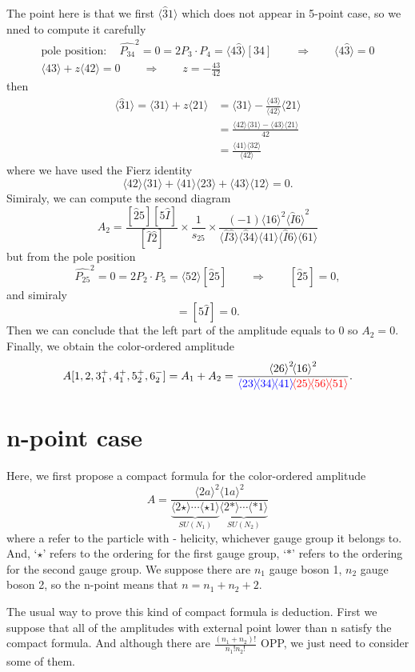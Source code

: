 \documentclass[12pt]{article}
\newcommand{\mdavg}[2]{\langle #1 \rangle\!\langle #2 \rangle}
\newcommand{\avg}[1]{\langle #1 \rangle}
\newcommand{\inavg}[2]{\langle #1 \rangle\! [#2]}
\newcommand{\asqu}[1]{{\langle#1\rangle}^2}
\begin{document}
The point here is that we first $\avg{\hat{3}1}$ which does not appear in 5-point case, so we nned to compute it carefully
\begin{gather*}
    \text{pole position}: \quad \hat{P_{34}}^2=0=2P_3\cdot P_4=\inavg{4\hat{3}}{34}\qquad\Rightarrow \qquad \avg{4\hat{3}}=0\\
    \avg{43}+z\avg{42}=0\qquad \Rightarrow \qquad z=-\frac{43}{42}
\end{gather*}
then
\begin{align*}
    \avg{\hat{3}1}=\avg{31}+z\avg{21}&=\avg{31}-\frac{\avg{43}}{\avg{42}}\avg{21}\\
    &=\frac{\mdavg{42}{31}-\mdavg{43}{21}}{42}\\
    &=\frac{\mdavg{41}{32}}{\avg{42}}
\end{align*}
where we have used the Fierz identity
\begin{equation*}
    \mdavg{42}{31}+\mdavg{41}{23}+\mdavg{43}{12}=0.
\end{equation*}
Simiraly, we can compute the second diagram
\begin{equation*}
    A_2=\frac{[\hat{2}5][5\hat{I}]}{[\hat{I}\hat{2}]}\times\frac{1}{s_{25}}\times \frac{(-1)\asqu{16}\asqu{\hat{I}6}}{\mdavg{\hat{I}\hat{3}}{\hat{3}4}
    \!\mdavg{41}{\hat{I}6}\!\avg{61}}
\end{equation*}
but from the pole position
\begin{equation*}
    \hat{P_{25}}^2=0=2P_2\cdot P_5=\inavg{52}{\hat{2}5}\qquad\Rightarrow \qquad [\hat{2}5]=0,
\end{equation*}
and simiraly
\begin{equation*}
    [\hat{2}\hat{I}]=[5\hat{I}]=0.
\end{equation*}
Then we can conclude that the left part of the amplitude equals to 0 so $A_2=0$. Finally, we obtain the color-ordered amplitude 
\begin{equation*}
    A[1,2,3_1^+,4_1^+,5_2^+,6_2^-]=A_1+A_2=\frac{\asqu{26}\!\asqu{16}}{\textcolor{blue}{\mdavg{23}{34}\!\avg{41}}\!\textcolor{red}{\mdavg{25}{56}\!\avg{51}}}.
\end{equation*}
\section{n-point case}
Here, we first propose a compact formula for the color-ordered amplitude
\begin{equation*}
    A=\frac{\asqu{2a}\!\asqu{1a}}{\underbrace{\avg{2\star}\cdots \avg{\star 1}}_{SU(N_1)}\underbrace{\avg{2\ast }\cdots \avg{\ast 1}}_{SU(N_2)}}
\end{equation*}
where a refer to the particle with - helicity, whichever gauge group it belongs to. And, `$\star$' refers to the ordering for the first gauge group, `$\ast$'
refers to the ordering for the second gauge group. We suppose there are $n_1$ gauge boson 1, $n_2$ gauge boson 2, so the n-point means that $n=n_1+n_2+2$.
\par
The usual way to prove this kind of compact formula is deduction. First we suppose that all of the amplitudes with external point lower than n satisfy the compact formula.
And although there are $\frac{(n_1+n_2)!}{n_1!n_2!}$ OPP, we just need to consider some of them. 
\end{document}
